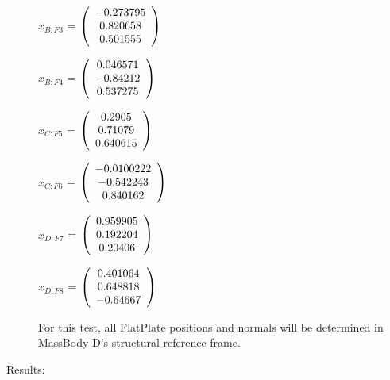 \begin{description}
$\hat{x}_{B:F3}$ = $\left( \begin{array} {ccc}  -0.273795 \\   0.820658 \\   0.501555
\end{array} \right)\\ \\$

$\hat{x}_{B:F4}$ = $\left( \begin{array} {ccc}   0.046571 \\   -0.84212 \\   0.537275
\end{array} \right)\\ \\$

$\hat{x}_{C:F5}$ = $\left( \begin{array} {ccc}     0.2905 \\    0.71079 \\   0.640615
\end{array} \right)\\ \\$

$\hat{x}_{C:F6}$ = $\left( \begin{array} {ccc} -0.0100222 \\  -0.542243 \\   0.840162
\end{array} \right)\\ \\$

$\hat{x}_{D:F7}$ = $\left( \begin{array} {ccc}   0.959905 \\   0.192204 \\    0.20406
\end{array} \right)\\ \\$

$\hat{x}_{D:F8}$ = $\left( \begin{array} {ccc}   0.401064 \\   0.648818 \\   -0.64667
\end{array} \right)\\ \\$

For this test, all FlatPlate positions and normals will be determined in
MassBody D's structural reference frame.

\item[Results:] \ \newline


\end{description}
